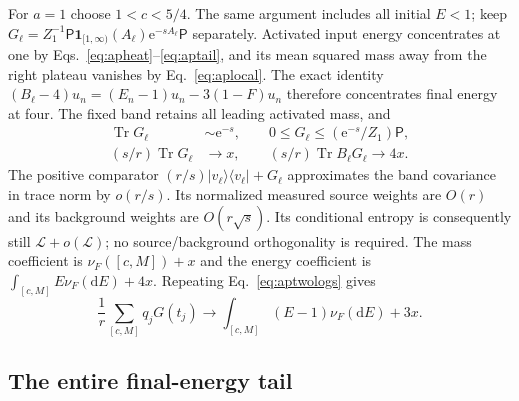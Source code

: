 \documentclass[aps,pra,reprint,superscriptaddress,longbibliography]{revtex4-2}
\newcommand{\Tr}{\operatorname{Tr}}
\newcommand{\dd}{\mathrm d}
\newcommand{\ee}{\mathrm e}
\newcommand{\ket}[1]{\lvert#1\rangle}
\newcommand{\bra}[1]{\langle#1\rvert}
\newcommand{\one}{\mathbf 1}
\begin{document}
For $a=1$ choose $1<c<5/4$. The same argument includes all initial
$E<1$; keep
$G_\ell=Z_1^{-1}\mathsf P\one_{[1,\infty)}(A_\ell)
\ee^{-sA_\ell}\mathsf P$ separately. Activated input energy
concentrates at one by Eqs.~\eqref{eq:apheat}--\eqref{eq:aptail},
and its mean squared mass away from the right plateau vanishes by
Eq.~\eqref{eq:aplocal}. The exact identity
$(B_\ell-4)u_n=(E_n-1)u_n-3(1-F)u_n$ therefore concentrates final
energy at four. The fixed band retains all leading activated mass,
and
\begin{align}
 \Tr G_\ell&\sim\ee^{-s},\qquad
 0\le G_\ell\le(\ee^{-s}/Z_1)\mathsf P,\nonumber\\
 (s/r)\Tr G_\ell&\to x,\qquad
 (s/r)\Tr B_\ell G_\ell\to4x.                            \label{eq:apfour}
\end{align}
The positive comparator $(r/s)\ket{v_\ell}\bra{v_\ell}+G_\ell$
approximates the band covariance in trace norm by $o(r/s)$.
Its normalized measured source weights are $O(r)$ and its background
weights are $O(r\sqrt s)$. Its conditional entropy is consequently
still $\mathcal L+o(\mathcal L)$; no source/background orthogonality
is required. The mass coefficient is $\nu_F([c,M])+x$ and the energy
coefficient is $\int_{[c,M]}E\nu_F(\dd E)+4x$. Repeating
Eq.~\eqref{eq:aptwologs} gives
\begin{equation}
 \frac1r\sum_{[c,M]}q_jG(t_j)
              \to\int_{[c,M]}(E-1)\nu_F(\dd E)+3x.       \label{eq:apactivatedentropy}
\end{equation}

\subsection{The entire final-energy tail}
\end{document}
